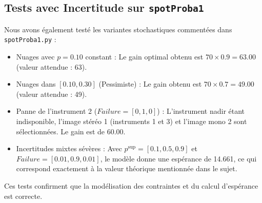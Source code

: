 \subsection{Tests avec Incertitude sur \texttt{spotProba1}}
Nous avons également testé les variantes stochastiques commentées dans \texttt{spotProba1.py} :
\begin{itemize}
    \item Nuages avec $p=0.10$ constant : Le gain optimal obtenu est $70 \times 0.9 = 63.00$ (valeur attendue : 63).
    \item Nuages dans $[0.10, 0.30]$ (Pessimiste) : Le gain obtenu est $70 \times 0.7 = 49.00$ (valeur attendue : 49).
    \item Panne de l'instrument 2 ($Failure=[0, 1, 0]$) : L'instrument nadir étant indisponible, l'image stéréo 1 (instruments 1 et 3) et l'image mono 2 sont sélectionnées. Le gain est de 60.00.
    \item Incertitudes mixtes sévères : Avec $p^{\sup} = [0.1, 0.5, 0.9]$ et $Failure = [0.01, 0.9, 0.01]$, le modèle donne une espérance de 14.661, ce qui correspond exactement à la valeur théorique mentionnée dans le sujet.
\end{itemize}

Ces tests confirment que la modélisation des contraintes et du calcul d'espérance est correcte.

